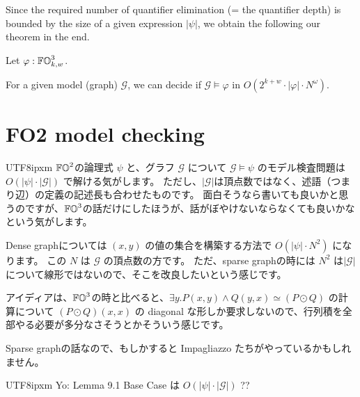 \documentclass[a4paper,UKenglish,cleveref, autoref, thm-restate]{lipics-v2021}
\newcounter{tempTheoremCounter} %
\newenvironment{Jcomment}%
{\begin{screen}\begin{CJK}{UTF8}{ipxm}}%
{\end{CJK}\end{screen}}
\begin{document}
Since the required number of quantifier elimination (= the quantifier depth) is bounded by the size of a given expression $|\psi|$, we obtain the following our theorem in the end.


\setcounter{tempTheoremCounter}{\value{theorem}}
\begin{theorem}[Restatement]
Let $\varphi : \mathbb{FO}^3_{k, w}$.

For a given model (graph) $\mathcal{G}$,
we can decide if $\mathcal{G} \models \varphi$ in $O(2^{k+w} \cdot |\varphi| \cdot N^{\omega})$.
\end{theorem}
\setcounter{theorem}{\value{tempTheoremCounter}}

\section{FO2 model checking}

\begin{Jcomment}
    $\mathbb{FO}^2$の論理式 $\psi$ と、グラフ $\mathcal{G}$ について
    $\mathcal{G} \models \psi$ のモデル検査問題は
    $O(|\psi| \cdot |\mathcal{G}|)$ で解ける気がします。
    ただし、$|\mathcal{G}|$は頂点数ではなく、述語（つまり辺）の定義の記述長も合わせたものです。
    面白そうなら書いても良いかと思うのですが、$\mathbb{FO}^3$の話だけにしたほうが、話がぼやけないならなくても良いかなという気がします。

    Dense graphについては $(x, y)$ の値の集合を構築する方法で $O(|\psi| \cdot N^2)$ になります。
    この $N$ は $\mathcal{G}$ の頂点数の方です。
    ただ、sparse graphの時には $N^2$ は$|\mathcal{G}|$について線形ではないので、そこを改良したいという感じです。

    アイディアは、$\mathbb{FO}^3$の時と比べると、$\exists y. P(x, y) \land Q(y, x) \simeq (P \odot Q)$ の計算について $(P \odot Q)(x, x)$ の diagonal な形しか要求しないので、行列積を全部やる必要が多分なさそうとかそういう感じです。

    Sparse graphの話なので、もしかすると Impagliazzo たちがやっているかもしれません。
\end{Jcomment}

\begin{Jcomment}
    Yo:
    \cite{gaoCompletenessFirstorderProperties2018} Lemma 9.1 Base Case は $O(|\psi| \cdot |\mathcal{G}|)$ ??
\end{Jcomment}

\end{document}
